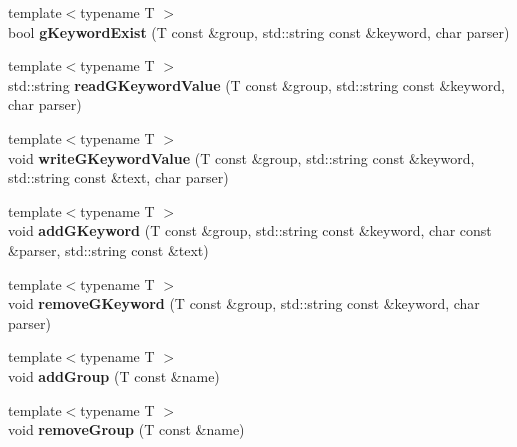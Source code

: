 \begin{DoxyCompactItemize}
\item 
\hypertarget{classstb_1_1GroupedKeyWordFile_a314a8662caa94f5c571abdb51e192e9e}{{\footnotesize template$<$typename T $>$ }\\bool {\bfseries g\+Keyword\+Exist} (T const \&group, std\+::string const \&keyword, char parser)}\label{classstb_1_1GroupedKeyWordFile_a314a8662caa94f5c571abdb51e192e9e}

\item 
\hypertarget{classstb_1_1GroupedKeyWordFile_a9e96b79aa35d361a5e8397f44ad805ed}{{\footnotesize template$<$typename T $>$ }\\std\+::string {\bfseries read\+G\+Keyword\+Value} (T const \&group, std\+::string const \&keyword, char parser)}\label{classstb_1_1GroupedKeyWordFile_a9e96b79aa35d361a5e8397f44ad805ed}

\item 
\hypertarget{classstb_1_1GroupedKeyWordFile_ab7dd7dba533406f5cca1995f0333f9e2}{{\footnotesize template$<$typename T $>$ }\\void {\bfseries write\+G\+Keyword\+Value} (T const \&group, std\+::string const \&keyword, std\+::string const \&text, char parser)}\label{classstb_1_1GroupedKeyWordFile_ab7dd7dba533406f5cca1995f0333f9e2}

\item 
\hypertarget{classstb_1_1GroupedKeyWordFile_a1c3d1504dfc5427523ea4ad61816b404}{{\footnotesize template$<$typename T $>$ }\\void {\bfseries add\+G\+Keyword} (T const \&group, std\+::string const \&keyword, char const \&parser, std\+::string const \&text)}\label{classstb_1_1GroupedKeyWordFile_a1c3d1504dfc5427523ea4ad61816b404}

\item 
\hypertarget{classstb_1_1GroupedKeyWordFile_afcfe2a13b1f415cc760bc208c23d03c7}{{\footnotesize template$<$typename T $>$ }\\void {\bfseries remove\+G\+Keyword} (T const \&group, std\+::string const \&keyword, char parser)}\label{classstb_1_1GroupedKeyWordFile_afcfe2a13b1f415cc760bc208c23d03c7}

\item 
\hypertarget{classstb_1_1GroupedKeyWordFile_a1399d4f6c57f8f53093098bd089a6a50}{{\footnotesize template$<$typename T $>$ }\\void {\bfseries add\+Group} (T const \&name)}\label{classstb_1_1GroupedKeyWordFile_a1399d4f6c57f8f53093098bd089a6a50}

\item 
\hypertarget{classstb_1_1GroupedKeyWordFile_aaa31dced1b0d04aeb0647adbf8198289}{{\footnotesize template$<$typename T $>$ }\\void {\bfseries remove\+Group} (T const \&name)}\label{classstb_1_1GroupedKeyWordFile_aaa31dced1b0d04aeb0647adbf8198289}

\end{DoxyCompactItemize}
